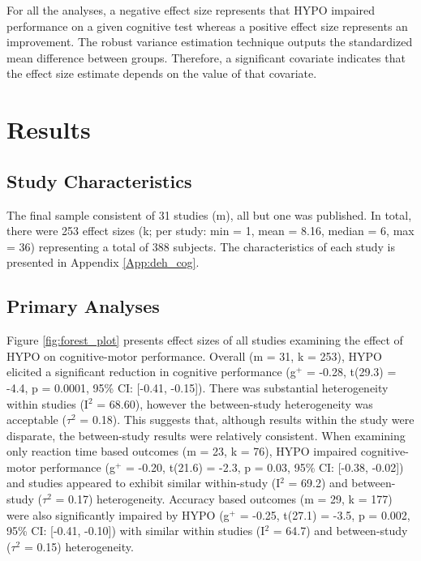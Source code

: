 For all the analyses, a negative effect size represents that HYPO impaired performance on a given cognitive test whereas a positive effect size represents an improvement. The robust variance estimation technique outputs the standardized mean difference between groups. Therefore, a significant covariate indicates that the effect size estimate depends on the value of that covariate.

\section{Results}

\subsection{Study Characteristics}
The final sample consistent of 31 studies (m), all but one was published. In total, there were 253 effect sizes (k; per study: min = 1, mean = 8.16, median = 6, max = 36) representing a total of 388 subjects. The characteristics of each study is presented in Appendix \ref{App:deh_cog}. 

\subsection{Primary Analyses}
Figure \ref{fig:forest_plot} presents effect sizes of all studies examining the effect of HYPO on cognitive-motor performance. Overall (m = 31, k = 253), HYPO elicited a significant reduction in cognitive performance (g${^+}$ = -0.28, t(29.3) = -4.4, p = 0.0001, 95\% CI: [-0.41, -0.15]). There was substantial heterogeneity within studies (I${^2}$ = 68.60), however the between-study heterogeneity was acceptable (${\tau}$${^2}$ = 0.18). This suggests that, although results within the study were disparate, the between-study results were relatively consistent. When examining only reaction time based outcomes (m = 23, k = 76), HYPO impaired cognitive-motor performance (g${^+}$ = -0.20, t(21.6) = -2.3, p = 0.03, 95\% CI: [-0.38, -0.02]) and studies appeared to exhibit similar within-study (I${^2}$ = 69.2) and between-study (${\tau}$${^2}$ = 0.17) heterogeneity. Accuracy based outcomes (m = 29, k = 177) were also significantly impaired by HYPO (g${^+}$ = -0.25, t(27.1) = -3.5, p = 0.002, 95\% CI: [-0.41, -0.10]) with similar within studies (I${^2}$ = 64.7) and between-study (${\tau}$${^2}$ = 0.15) heterogeneity.

